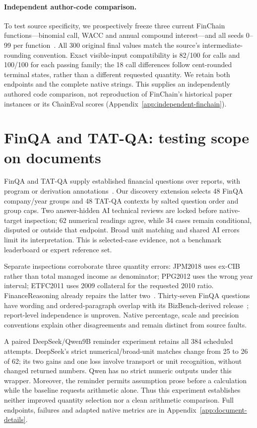 \paragraph{Independent author-code comparison.} To test source specificity, we prospectively freeze three current FinChain functions---binomial call, WACC and annual compound interest---and all seeds 0--99 per function~\cite{finchain,finchaincode}. All 300 original final values match the source's intermediate-rounding convention. Exact visible-input compatibility is 82/100 for calls and 100/100 for each passing family; the 18 call differences follow cent-rounded terminal states, rather than a different requested quantity. We retain both endpoints and the complete native strings. This supplies an independently authored code comparison, not reproduction of FinChain's historical paper instances or its ChainEval scores (Appendix~\ref{app:independent-finchain}).

\section{FinQA and TAT-QA: testing scope on documents}\label{sec:documents}
FinQA and TAT-QA supply established financial questions over reports, with program or derivation annotations~\cite{finqa,tatqa}. Our discovery extension selects 48 FinQA company/year groups and 48 TAT-QA contexts by salted question order and group caps. Two answer-hidden AI technical reviews are locked before native-target inspection; 62 numerical readings agree, while 34 cases remain conditional, disputed or outside that endpoint. Broad unit matching and shared AI errors limit its interpretation. This is selected-case evidence, not a benchmark leaderboard or expert reference set.

Separate inspections corroborate three quantity errors: JPM2018 uses ex-CIB rather than total managed income as denominator; PPG2012 uses the wrong year interval; ETFC2011 uses 2009 collateral for the requested 2010 ratio. FinanceReasoning already repairs the latter two~\cite{financereasoning}. Thirty-seven FinQA questions have wording and ordered-paragraph overlap with its BizBench-derived release~\cite{bizbench}; report-level independence is unproven. Native percentage, scale and precision conventions explain other disagreements and remain distinct from source faults.

A paired DeepSeek/Qwen9B reminder experiment retains all 384 scheduled attempts. DeepSeek's strict numerical/broad-unit matches change from 25 to 26 of 62; its two gains and one loss involve transport or unit recognition, without changed returned numbers. Qwen has no strict numeric outputs under this wrapper. Moreover, the reminder permits assumption prose before a calculation while the baseline requests arithmetic alone. Thus this experiment establishes neither improved quantity selection nor a clean arithmetic comparison. Full endpoints, failures and adapted native metrics are in Appendix~\ref{app:document-details}.

